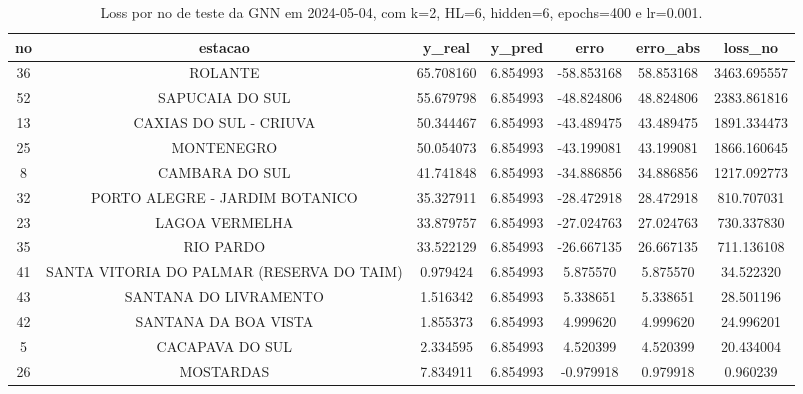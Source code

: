 \begin{table}[h]
\centering
\caption{Loss por no de teste da GNN em 2024-05-04, com k=2, HL=6, hidden=6, epochs=400 e lr=0.001.}
\label{tab:gnn_loss_k2_hl6_h6_e400_d20240504}
\begin{tabular}{ccccccc}
\toprule
no & estacao & y\_real & y\_pred & erro & erro\_abs & loss\_no \\
\midrule
36 & ROLANTE & 65.708160 & 6.854993 & -58.853168 & 58.853168 & 3463.695557 \\
52 & SAPUCAIA DO SUL & 55.679798 & 6.854993 & -48.824806 & 48.824806 & 2383.861816 \\
13 & CAXIAS DO SUL - CRIUVA & 50.344467 & 6.854993 & -43.489475 & 43.489475 & 1891.334473 \\
25 & MONTENEGRO & 50.054073 & 6.854993 & -43.199081 & 43.199081 & 1866.160645 \\
8 & CAMBARA DO SUL & 41.741848 & 6.854993 & -34.886856 & 34.886856 & 1217.092773 \\
32 & PORTO ALEGRE - JARDIM BOTANICO & 35.327911 & 6.854993 & -28.472918 & 28.472918 & 810.707031 \\
23 & LAGOA VERMELHA & 33.879757 & 6.854993 & -27.024763 & 27.024763 & 730.337830 \\
35 & RIO PARDO & 33.522129 & 6.854993 & -26.667135 & 26.667135 & 711.136108 \\
41 & SANTA VITORIA DO PALMAR (RESERVA DO TAIM) & 0.979424 & 6.854993 & 5.875570 & 5.875570 & 34.522320 \\
43 & SANTANA DO LIVRAMENTO & 1.516342 & 6.854993 & 5.338651 & 5.338651 & 28.501196 \\
42 & SANTANA DA BOA VISTA & 1.855373 & 6.854993 & 4.999620 & 4.999620 & 24.996201 \\
5 & CACAPAVA DO SUL & 2.334595 & 6.854993 & 4.520399 & 4.520399 & 20.434004 \\
26 & MOSTARDAS & 7.834911 & 6.854993 & -0.979918 & 0.979918 & 0.960239 \\
\bottomrule
\end{tabular}
\end{table}
